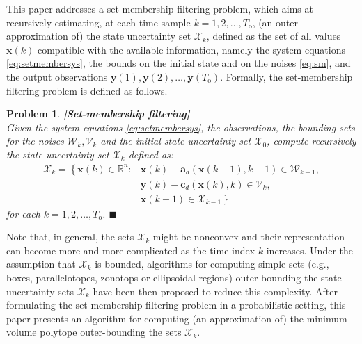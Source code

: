 \documentclass[twocolumn]{autart}
\newtheorem{problem}{Problem}
\newtheorem{remark}{Remark}{\normalfont}{\normalfont}
\newcommand{\DP}[1]{{#1}}
\begin{document}
This paper addresses a set-membership filtering problem, which aims at recursively estimating, at each time sample $k=1,2,\ldots,T_{\mathrm{o}}$, (an outer approximation of) the state uncertainty set $\mathcal{X}_k$, defined as the set of all values $\mathbf{x}(k)$ compatible with the available information, namely the system equations \eqref{eq:setmembersys}, the bounds on the initial state and on the noises  \eqref{eq:sm}, and the output observations $\mathbf{y}(1),\mathbf{y}(2),\ldots,\mathbf{y}(T_{\mathrm{o}})$. Formally, the set-membership filtering problem is defined as follows.

 \begin{problem}  \normalfont \textbf{[Set-membership filtering] \label{Problem:PWAregr}} \\
 Given the system equations \eqref{eq:setmembersys}, the observations, the bounding sets for the noises $\mathcal{W}_k,\mathcal{V}_k$ and the initial state uncertainty set $\mathcal{X}_0$, compute recursively the state uncertainty set $\mathcal{X}_k$ defined as:
 \begin{equation} \label{eqn:defXk}
 \begin{array}{ll}
 \mathcal{X}_k=\left\{ \right.  \mathbf{x}(k)\! \in \!\mathbb{R}^n\!\!: &   \mathbf{x}(k) \! - \! \mathbf{a}_d(\mathbf{x}(k-1),k-1) \! \in \! \DP{\mathcal{W}_{k-1},} \nonumber  \\
   &  \mathbf{y}(k)-\mathbf{c}_d(\mathbf{x}(k),k) \in \mathcal{V}_k, \nonumber \\
   &  \mathbf{x}(k-1) \in \mathcal{X}_{k-1}   \left. \right\}
 \end{array}
 \end{equation}
   for each $k=1,2,\ldots,T_{\mathrm{o}}$. \hfill $\blacksquare$
 \end{problem}
 Note that, in general, the sets $\mathcal{X}_k$ might be nonconvex and their representation can become more and more 
complicated as the time index $k$ increases. Under the assumption that $\mathcal{X}_k$ is bounded, algorithms for 
computing simple sets (e.g., boxes, parallelotopes, zonotops or ellipsoidal regions) outer-bounding the state 
uncertainty sets $\mathcal{X}_k$  have been then proposed to reduce this complexity. %
After formulating the set-membership filtering problem in a probabilistic setting, this paper presents an algorithm for computing (an approximation of) the minimum-volume polytope outer-bounding the  sets $\mathcal{X}_k$.
%
\end{document}

